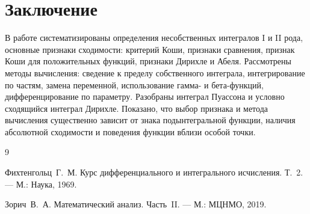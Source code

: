 \documentclass[12pt,a4paper]{article}
\theoremstyle{definition}
\theoremstyle{plain}
\theoremstyle{remark}
\begin{document}
\section*{Заключение}

В работе систематизированы определения несобственных интегралов I и II рода, основные признаки сходимости: критерий Коши, признаки сравнения, признак Коши для положительных функций, признаки Дирихле и Абеля. Рассмотрены методы вычисления: сведение к пределу собственного интеграла, интегрирование по частям, замена переменной, использование гамма- и бета-функций, дифференцирование по параметру. Разобраны интеграл Пуассона и условно сходящийся интеграл Дирихле. Показано, что выбор признака и метода вычисления существенно зависит от знака подынтегральной функции, наличия абсолютной сходимости и поведения функции вблизи особой точки.

\begin{thebibliography}{9}

Фихтенгольц~Г.~М.
Курс дифференциального и интегрального исчисления. Т.~2.
--- М.: Наука, 1969.

Зорич~В.~А.
Математический анализ. Часть~II.
--- М.: МЦНМО, 2019.

\end{thebibliography}
\end{document}
